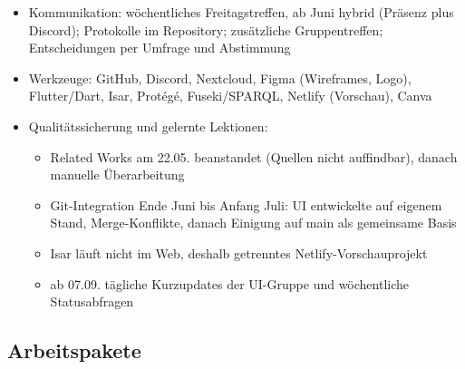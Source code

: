 \begin{itemize}
\begin{itemize}
    \end{itemize}
    \item Kommunikation: wöchentliches Freitagstreffen, ab Juni hybrid (Präsenz plus Discord); Protokolle im Repository; zusätzliche Gruppentreffen; Entscheidungen per Umfrage und Abstimmung
    \item Werkzeuge: GitHub, Discord, Nextcloud, Figma (Wireframes, Logo), Flutter/Dart, Isar, Protégé, Fuseki/SPARQL, Netlify (Vorschau), Canva
    \item Qualitätssicherung und gelernte Lektionen:
    \begin{itemize}
        \item Related Works am 22.05. beanstandet (Quellen nicht auffindbar), danach manuelle Überarbeitung
        \item Git-Integration Ende Juni bis Anfang Juli: UI entwickelte auf eigenem Stand, Merge-Konflikte, danach Einigung auf main als gemeinsame Basis
        \item Isar läuft nicht im Web, deshalb getrenntes Netlify-Vorschauprojekt
        \item ab 07.09. tägliche Kurzupdates der UI-Gruppe und wöchentliche Statusabfragen
    \end{itemize}
\end{itemize}

\subsection{Arbeitspakete}

